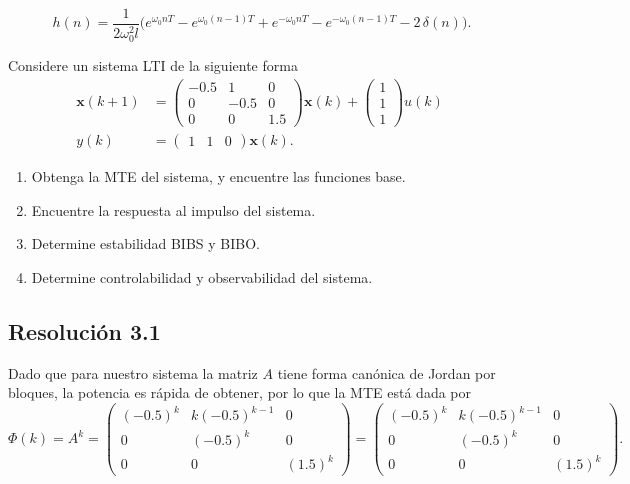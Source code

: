 \documentclass[
  11pt,
  letterpaper,
   addpoints,
  answers
  ]{exam}
\begin{document}
\begin{questions}
\begin{solution}
\begin{equation}
\boxed{\;
h(n)=\frac{1}{2\omega_0^{2} l}
\Big(
e^{\omega_0 nT}-e^{\omega_0 (n-1)T}
+e^{-\omega_0 nT}-e^{-\omega_0 (n-1)T}
-2\,\delta(n)
\Big).}
\end{equation}
\end{solution}
\question Considere un sistema LTI de la siguiente forma
\begin{align*}
\mathbf{x}(k+1) &= \begin{pmatrix} -0.5 & 1 & 0 \\ 0 & -0.5 & 0 \\ 0 & 0 & 1.5 \end{pmatrix} \mathbf{x}(k) + \begin{pmatrix} 1 \\ 1 \\ 1 \end{pmatrix} u(k) \\
y(k) &= \begin{pmatrix} 1 & 1 & 0 \end{pmatrix} \mathbf{x}(k).
\end{align*}

\begin{enumerate}
  \item Obtenga la MTE del sistema, y encuentre las funciones base.
  \item Encuentre la respuesta al impulso del sistema.
  \item Determine estabilidad BIBS y BIBO.
  \item Determine controlabilidad y observabilidad del sistema.
\end{enumerate}
\begin{solution}

\subsection*{Resolución 3.1}

Dado que para nuestro sistema la matriz $A$ tiene forma canónica de Jordan por bloques, la
potencia es rápida de obtener, por lo que la MTE está dada por
\begin{equation}
\Phi(k)=A^{k}=
\begin{pmatrix}
(-0.5)^{k} & k(-0.5)^{k-1} & 0\\
0          & (-0.5)^{k}    & 0\\
0          & 0              & (1.5)^{k}
\end{pmatrix}
=
\begin{pmatrix}
(-0.5)^{k} & k(-0.5)^{k-1} & 0\\
0          & (-0.5)^{k}    & 0\\
0          & 0              & (1.5)^{k}
\end{pmatrix}.
\tag{3}
\end{equation}


\end{solution}
\end{questions}
\end{document}

